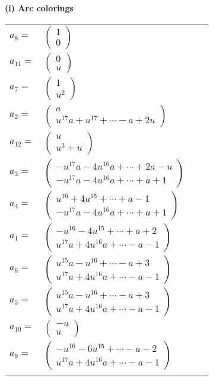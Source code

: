 \documentclass[1p]{elsarticle_modified}
\theoremstyle{definition}
\begin{document}
\flushleft \textbf{(i) Arc colorings}\\
\begin{tabular}{m{7pt} m{180pt} m{7pt} m{180pt} }
\flushright $a_{8}=$&$\begin{pmatrix}1\\0\end{pmatrix}$ \\
\flushright $a_{11}=$&$\begin{pmatrix}0\\u\end{pmatrix}$ \\
\flushright $a_{7}=$&$\begin{pmatrix}1\\u^2\end{pmatrix}$ \\
\flushright $a_{2}=$&$\begin{pmatrix}a\\u^{17} a+u^{17}+\cdots- a+2 u\end{pmatrix}$ \\
\flushright $a_{12}=$&$\begin{pmatrix}u\\u^3+u\end{pmatrix}$ \\
\flushright $a_{3}=$&$\begin{pmatrix}- u^{17} a-4 u^{16} a+\cdots+2 a- u\\- u^{17} a-4 u^{16} a+\cdots+a+1\end{pmatrix}$ \\
\flushright $a_{4}=$&$\begin{pmatrix}u^{16}+4 u^{15}+\cdots+a-1\\- u^{17} a-4 u^{16} a+\cdots+a+1\end{pmatrix}$ \\
\flushright $a_{1}=$&$\begin{pmatrix}- u^{16}-4 u^{15}+\cdots+a+2\\u^{17} a+4 u^{16} a+\cdots- a-1\end{pmatrix}$ \\
\flushright $a_{6}=$&$\begin{pmatrix}u^{15} a- u^{16}+\cdots- a+3\\u^{17} a+4 u^{16} a+\cdots- a-1\end{pmatrix}$ \\
\flushright $a_{5}=$&$\begin{pmatrix}u^{15} a- u^{16}+\cdots- a+3\\u^{17} a+4 u^{16} a+\cdots- a-1\end{pmatrix}$ \\
\flushright $a_{10}=$&$\begin{pmatrix}- u\\u\end{pmatrix}$ \\
\flushright $a_{9}=$&$\begin{pmatrix}- u^{16}-6 u^{15}+\cdots- a-2\\u^{17} a+4 u^{16} a+\cdots- a-1\end{pmatrix}$\\&\end{tabular}
\end{document}

